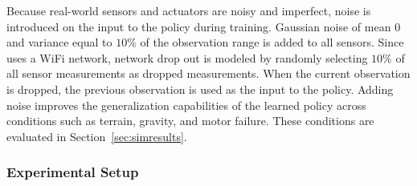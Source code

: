 Because real-world sensors and actuators are noisy and imperfect, noise is introduced on the input to the policy during training. 
Gaussian noise of mean \(0\) and variance equal to \(10\%\) of the observation range is added to all sensors.
Since \SB{} uses a WiFi network, network drop out is modeled by randomly selecting \(10\%\) of all sensor measurements as dropped measurements. 
When the current observation is dropped, the previous observation is used as the input to the policy. 
Adding noise improves the generalization capabilities of the learned policy across conditions such as terrain, gravity, and motor failure.
These conditions are evaluated in Section~\ref{sec:simresults}.




\subsubsection{Experimental Setup}
\label{sec:setup}

